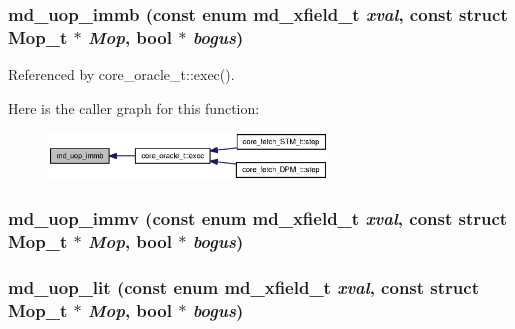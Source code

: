 \subsubsection[{md\_\-uop\_\-immb}]{ md\_\-uop\_\-immb (const enum {\bf md\_\-xfield\_\-t} {\em xval}, \/  const struct {\bf Mop\_\-t} $\ast$ {\em Mop}, \/  bool $\ast$ {\em bogus})}\label{machine_8h_e10ffaf1df8ee9dc086b4d3e45051bd0}




Referenced by core\_\-oracle\_\-t::exec().

Here is the caller graph for this function:\nopagebreak
\begin{figure}[H]
\begin{center}
\leavevmode
\includegraphics[width=210pt]{machine_8h_e10ffaf1df8ee9dc086b4d3e45051bd0_icgraph}
\end{center}
\end{figure}
\subsubsection[{md\_\-uop\_\-immv}]{ md\_\-uop\_\-immv (const enum {\bf md\_\-xfield\_\-t} {\em xval}, \/  const struct {\bf Mop\_\-t} $\ast$ {\em Mop}, \/  bool $\ast$ {\em bogus})\hspace{0.3cm}{\tt  [inline]}}\label{machine_8h_b9811f2d4b703a336bf6cac55a18b84c}


\subsubsection[{md\_\-uop\_\-lit}]{ md\_\-uop\_\-lit (const enum {\bf md\_\-xfield\_\-t} {\em xval}, \/  const struct {\bf Mop\_\-t} $\ast$ {\em Mop}, \/  bool $\ast$ {\em bogus})\hspace{0.3cm}{\tt  [inline]}}\label{machine_8h_f2e7dc3e611f6a667c135d8798bf5c19}


